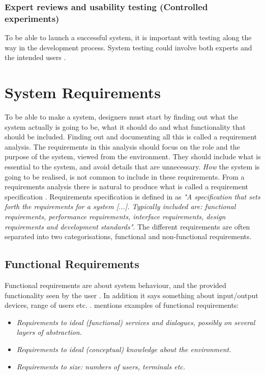 \subsubsection{Expert reviews and usability testing (Controlled experiments)}
To be able to launch a successful system, it is important with testing along the way in the development process. System testing could involve both experts and the intended users \cite{mmi}. 

\section{System Requirements}
\label{sec:systemreq}
To be able to make a system, designers must start by finding out what the system actually is going to be, what it should do and what functionality that should be included. Finding out and documenting all this is called a requirement analysis. The requirements in this analysis should focus on the role and the purpose of the system, viewed from the environment. They should include what is essential to the system, and avoid details that are unnecessary. \emph{How} the system is going to be realised, is not common to include in these requirements. From a requirements analysis there is natural to produce what is called a requirement specification \cite{braude2000software}. Requirements specification is defined in \cite{systemutviklingDel1} as \emph{"A specification that sets forth the requirements for a system [...]. Typically included are: functional requirements, performance requirements, interface requirements, design requirements and development standards"}. The different requirements are often separated into two categorisations, functional and non-functional requirements. 

\subsection{Functional Requirements}
Functional requirements are about system behaviour, and the provided functionality seen by the user \cite{systemutviklingDel1}. In addition it says something about input/output devices, range of users etc. \cite{mmi}. \cite{systemutviklingDel1} mentions examples of functional requirements:
\begin{itemize}
\item \emph{Requirements to ideal (functional) services and dialogues, possibly on several layers of abstraction.}
\item \emph{Requirements to ideal (conceptual) knowledge about the environment.}
\item \emph{Requirements to size: numbers of users, terminals etc.}
\end{itemize}     

